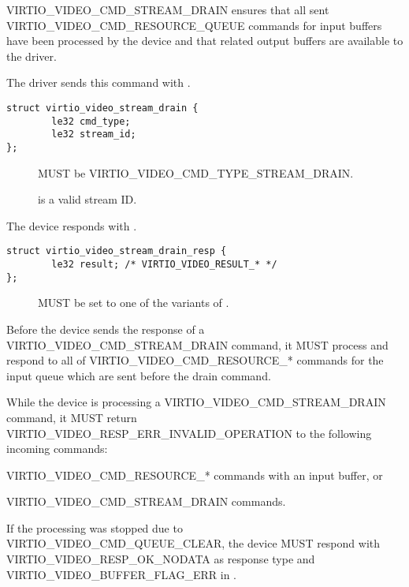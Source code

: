 \begin{description}
VIRTIO_VIDEO_CMD_STREAM_DRAIN ensures that all sent
VIRTIO_VIDEO_CMD_RESOURCE_QUEUE commands for input buffers have been processed
by the device and that related output buffers are available to the driver.

The driver sends this command with .
\begin{lstlisting}
struct virtio_video_stream_drain {
        le32 cmd_type;
        le32 stream_id;
};
\end{lstlisting}
\begin{description}
\item[] MUST be VIRTIO_VIDEO_CMD_TYPE_STREAM_DRAIN.
\item[] is a valid stream ID.
\end{description}

The device responds with .
\begin{lstlisting}
struct virtio_video_stream_drain_resp {
        le32 result; /* VIRTIO_VIDEO_RESULT_* */
};
\end{lstlisting}
\begin{description}
\item[] MUST be set to one of the variants of .
\end{description}

\begin{itemize*}
\item Before the device sends the response of a VIRTIO_VIDEO_CMD_STREAM_DRAIN
  command, it MUST process and respond to all of
  VIRTIO_VIDEO_CMD_RESOURCE_* commands for the input queue which are sent before
  the drain command.
\item While the device is processing a VIRTIO_VIDEO_CMD_STREAM_DRAIN
  command, it MUST return
  VIRTIO_VIDEO_RESP_ERR_INVALID_OPERATION to the following incoming commands:
  \begin{itemize*}
  \item VIRTIO_VIDEO_CMD_RESOURCE_* commands with an input buffer, or
  \item VIRTIO_VIDEO_CMD_STREAM_DRAIN commands.
  \end{itemize*}
\item If the processing was stopped due to
  VIRTIO_VIDEO_CMD_QUEUE_CLEAR, the device MUST respond with
  VIRTIO_VIDEO_RESP_OK_NODATA as response type and
  VIRTIO_VIDEO_BUFFER_FLAG_ERR in .
\end{itemize*}
\end{description}

